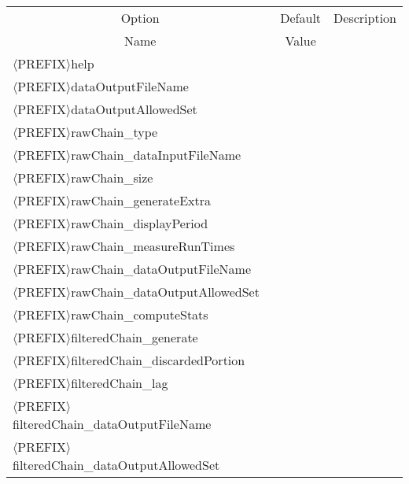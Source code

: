 \begin{table}[!h]
\begin{center}
\begin{tabular}{|l|c|c|}
\hline
\multicolumn{1}{|c|}{Option}                               & Default & Description \\
\multicolumn{1}{|c|}{Name}                                 & Value   &             \\
\hline
\hline
$\langle$PREFIX$\rangle$help                               &         &             \\
\hline
$\langle$PREFIX$\rangle$dataOutputFileName                 &         &             \\
\hline
$\langle$PREFIX$\rangle$dataOutputAllowedSet               &         &             \\
\hline
$\langle$PREFIX$\rangle$rawChain\_type                     &         &             \\
\hline
$\langle$PREFIX$\rangle$rawChain\_dataInputFileName         &         &             \\
\hline
$\langle$PREFIX$\rangle$rawChain\_size                      &         &             \\
\hline
$\langle$PREFIX$\rangle$rawChain\_generateExtra             &         &             \\
\hline
$\langle$PREFIX$\rangle$rawChain\_displayPeriod             &         &             \\
\hline
$\langle$PREFIX$\rangle$rawChain\_measureRunTimes           &         &             \\
\hline
$\langle$PREFIX$\rangle$rawChain\_dataOutputFileName        &         &             \\
\hline
$\langle$PREFIX$\rangle$rawChain\_dataOutputAllowedSet      &         &             \\
\hline
$\langle$PREFIX$\rangle$rawChain\_computeStats              &         &             \\
\hline
$\langle$PREFIX$\rangle$filteredChain\_generate             &         &             \\
\hline
$\langle$PREFIX$\rangle$filteredChain\_discardedPortion     &         &             \\
\hline
$\langle$PREFIX$\rangle$filteredChain\_lag                  &         &             \\
\hline
$\langle$PREFIX$\rangle$filteredChain\_dataOutputFileName   &         &             \\
\hline
$\langle$PREFIX$\rangle$filteredChain\_dataOutputAllowedSet &         &             \\

\end{tabular}
\end{center}
\end{table}
